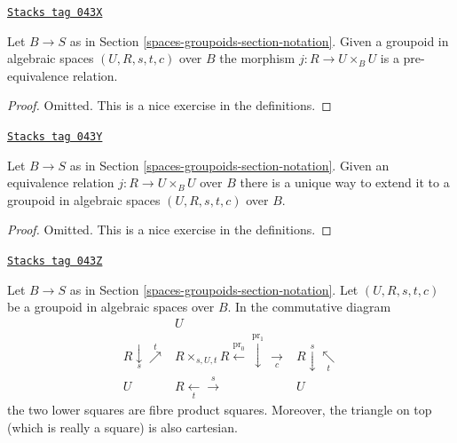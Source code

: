 \begin{lemma}
\label{spaces-groupoids-lemma-groupoid-pre-equivalence}
\href{https://stacks.math.columbia.edu/tag/043X}{\texttt{Stacks tag 043X}}

Let $B \to S$ as in Section \ref{spaces-groupoids-section-notation}.
Given a groupoid in algebraic spaces $(U, R, s, t, c)$ over $B$
the morphism $j : R \to U \times_B U$ is a pre-equivalence
relation.
\end{lemma}

\begin{proof}
Omitted.
This is a nice exercise in the definitions.
\end{proof}

\begin{lemma}
\label{spaces-groupoids-lemma-equivalence-groupoid}
\href{https://stacks.math.columbia.edu/tag/043Y}{\texttt{Stacks tag 043Y}}

Let $B \to S$ as in Section \ref{spaces-groupoids-section-notation}.
Given an equivalence relation $j : R \to U \times_B U$ over $B$
there is a unique way to extend it to a groupoid in algebraic spaces
$(U, R, s, t, c)$ over $B$.
\end{lemma}

\begin{proof}
Omitted.
This is a nice exercise in the definitions.
\end{proof}

\begin{lemma}[Diagram]
\label{spaces-groupoids-lemma-diagram}
\href{https://stacks.math.columbia.edu/tag/043Z}{\texttt{Stacks tag 043Z}}

Let $B \to S$ as in Section \ref{spaces-groupoids-section-notation}.
Let $(U, R, s, t, c)$ be a groupoid in algebraic spaces over $B$.
In the commutative diagram
$$
\begin{array}{ccc} & U &  \\ R \underset{s}{\downarrow}\overset{t}{\nearrow} & R \times_{s, U, t} R
\overset{\text{pr}_0}{\longleftarrow}\overset{\text{pr}_1}{\downarrow}\underset{c}{\longrightarrow} & R \overset{s}{\downarrow}\underset{t}{\nwarrow} \\ U & R \underset{t}{\longleftarrow}\overset{s}{\longrightarrow} & U\end{array}
$$
the two lower squares are fibre product squares.
Moreover, the triangle on top (which is really a square)
is also cartesian.
\end{lemma}

